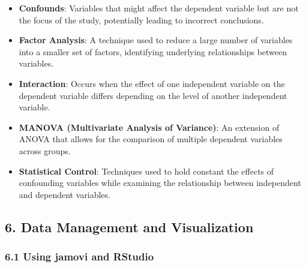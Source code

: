 \documentclass[
]{book}
\providecommand{\tightlist}{%
  \setlength{\itemsep}{0pt}\setlength{\parskip}{0pt}}
\begin{document}
\begin{itemize}
\tightlist
\item
  \textbf{Confounds}: Variables that might affect the dependent variable but are not the focus of the study, potentially leading to incorrect conclusions.
\item
  \textbf{Factor Analysis}: A technique used to reduce a large number of variables into a smaller set of factors, identifying underlying relationships between variables.
\item
  \textbf{Interaction}: Occurs when the effect of one independent variable on the dependent variable differs depending on the level of another independent variable.
\item
  \textbf{MANOVA (Multivariate Analysis of Variance)}: An extension of ANOVA that allows for the comparison of multiple dependent variables across groups.
\item
  \textbf{Statistical Control}: Techniques used to hold constant the effects of confounding variables while examining the relationship between independent and dependent variables.
\end{itemize}

\subsection*{\texorpdfstring{6. \textbf{Data Management and Visualization}}{6. Data Management and Visualization}}\label{data-management-and-visualization-1}

\subsubsection*{\texorpdfstring{\textbf{6.1 Using jamovi and RStudio}}{6.1 Using jamovi and RStudio}}\label{using-jamovi-and-rstudio}
\end{document}

